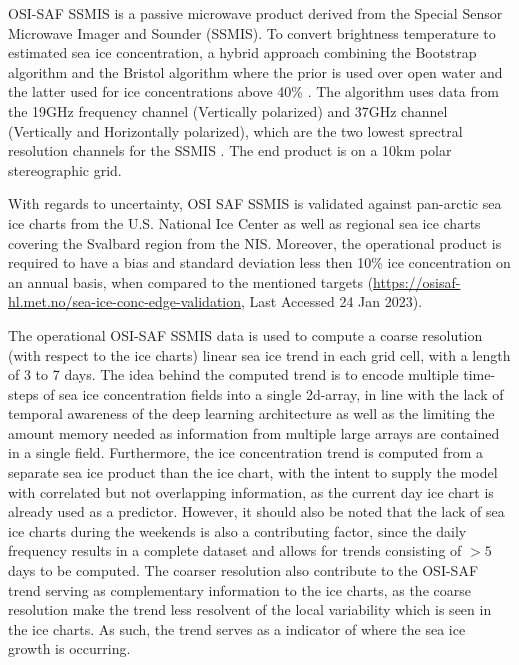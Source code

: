 \documentclass[../main/thesis.tex]{subfiles}
\begin{document}
OSI-SAF SSMIS is a passive microwave product derived from the Special Sensor Microwave Imager and Sounder (SSMIS). To convert brightness temperature to estimated sea ice concentration, a hybrid approach combining the Bootstrap algorithm \citep{Comiso1997} and the Bristol algorithm \citep{Smith1996} where the prior is used over open water and the latter used for ice concentrations above 40\% \citep{Tonboe2017}. The algorithm uses data from the 19GHz frequency channel (Vertically polarized) and 37GHz channel (Vertically and Horizontally polarized), which are the two lowest sprectral resolution channels for the SSMIS \cite{Tonboe2017}. The end product is on a 10km polar stereographic grid.

With regards to uncertainty, OSI SAF SSMIS is validated against pan-arctic sea ice charts from the U.S. National Ice Center as well as regional sea ice charts covering the Svalbard region from the NIS. Moreover, the operational product is required to have a bias and standard deviation less then 10\% ice concentration on an annual basis, when compared to the mentioned targets (\url{https://osisaf-hl.met.no/sea-ice-conc-edge-validation}, Last Accessed 24 Jan 2023). 

The operational OSI-SAF SSMIS data is used to compute a coarse resolution (with respect to the ice charts) linear sea ice trend in each grid cell, with a length of 3 to 7 days. The idea behind the computed trend is to encode multiple time-steps of sea ice concentration fields into a single 2d-array, in line with the lack of temporal awareness of the deep learning architecture as well as the limiting the amount memory needed as information from multiple large arrays are contained in a single field. Furthermore, the ice concentration trend is computed from a separate sea ice product than the ice chart, with the intent to supply the model with correlated but not overlapping information, as the current day ice chart is already used as a predictor. However, it should also be noted that the lack of sea ice charts during the weekends \citep{Dinessen2020} is also a contributing factor, since the daily frequency results in a complete dataset and allows for trends consisting of $>5$ days to be computed. The coarser resolution also contribute to the OSI-SAF trend serving as complementary information to the ice charts, as the coarse resolution make the trend less resolvent of the local variability which is seen in the ice charts. As such, the trend serves as a indicator of where the sea ice growth is occurring.
\end{document}
